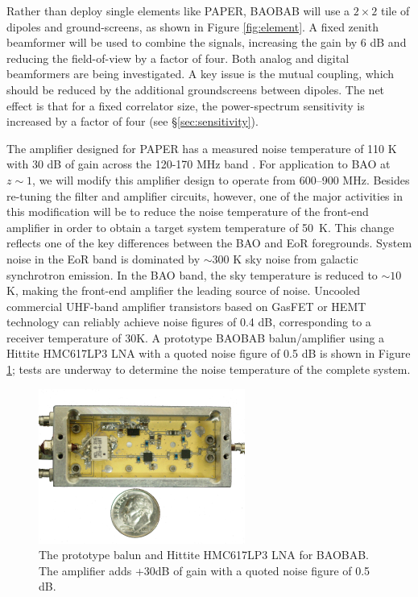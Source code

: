 \documentclass[10pt,iop]{emulateapj}
\begin{document}
Rather than deploy single elements like PAPER, BAOBAB will use a $2\times2$ tile
of dipoles and ground-screens, as shown in Figure \ref{fig:element}.  A fixed zenith beamformer 
will be used to combine the signals, increasing the gain by 6 dB and reducing the 
field-of-view by a factor of four.  Both analog and digital beamformers are being investigated.  
A key issue is the mutual coupling, which should be reduced by the additional groundscreens between 
dipoles.  The net effect is that for a fixed correlator size, the power-spectrum
sensitivity is increased by a factor of four (see \S\ref{sec:sensitivity}).

The amplifier designed for PAPER has a measured noise
temperature of 110 K with 30 dB of gain across the 120-170 MHz band \citep{parsons_et_al_2010}.
For application to BAO at $z\sim1$, we will modify this amplifier design to
operate from 600--900 MHz.  Besides re-tuning the filter and amplifier
circuits, however, one of the major activities in this modification will be
to reduce the noise temperature of the front-end amplifier in order to 
obtain a target system temperature of 50~K.
This change reflects one of the key differences between the BAO and
EoR foregrounds. System noise in the EoR band is dominated by $\sim\!\!300$ K sky noise
from galactic synchrotron emission.  In the BAO band, the sky temperature is reduced
to $\sim\!\!10$ K, making the front-end amplifier the leading source of noise.
Uncooled commercial UHF-band amplifier transistors based on GasFET or HEMT technology can
reliably achieve noise figures of 0.4 dB, corresponding to a receiver temperature of 30K.
A prototype BAOBAB balun/amplifier using a Hittite HMC617LP3 LNA with a quoted noise 
figure of 0.5 dB is shown in Figure \ref{fig:balun_rx}; tests are underway to determine
the noise temperature of the complete system.
\begin{figure}\centering
\includegraphics[height=2in]{baobab_amp.jpg}
\caption{The prototype balun and Hittite HMC617LP3 LNA for BAOBAB.  The amplifier adds +30dB of gain
with a quoted noise figure of 0.5 dB.}
\label{fig:balun_rx}
\end{figure}
\end{document}
